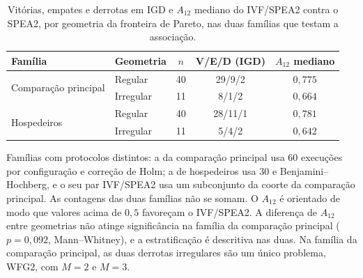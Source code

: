 \begin{table}[!htb]
    \centering
    \small
    \caption{Vitórias, empates e derrotas em IGD e $A_{12}$ mediano do IVF/SPEA2 contra o SPEA2, por geometria da fronteira de Pareto, nas duas famílias que testam a associação.}
    \label{tab:geometria_confirmatoria}
    \begin{tabular*}{\textwidth}{@{\extracolsep{\fill}}llccc@{}}
        \toprule
        \textbf{Família} & \textbf{Geometria} & \textbf{$n$} & \textbf{V/E/D (IGD)} & \textbf{$A_{12}$ mediano} \\
        \midrule
        \multirow{2}{*}{Comparação principal} & Regular & 40 & 29/9/2 & $0{,}775$ \\
         & Irregular & 11 & 8/1/2 & $0{,}664$ \\
        \midrule
        \multirow{2}{*}{Hospedeiros} & Regular & 40 & 28/11/1 & $0{,}781$ \\
         & Irregular & 11 & 5/4/2 & $0{,}642$ \\
        \bottomrule
    \end{tabular*}
    \par\smallskip
    \parbox{\textwidth}{\footnotesize
    Famílias com protocolos distintos: a da comparação principal usa 60 execuções por configuração e correção de Holm; a de hospedeiros usa 30 e Benjamini--Hochberg, e o seu par IVF/SPEA2 usa um subconjunto da coorte da comparação principal. As contagens das duas famílias não se somam. O $A_{12}$ é orientado de modo que valores acima de $0{,}5$ favoreçam o IVF/SPEA2. A diferença de $A_{12}$ entre geometrias não atinge significância na família da comparação principal ($p = 0{,}092$, Mann--Whitney), e a estratificação é descritiva nas duas. Na família da comparação principal, as duas derrotas irregulares são um único problema, WFG2, com $M = 2$ e $M = 3$.
    }
\end{table}
